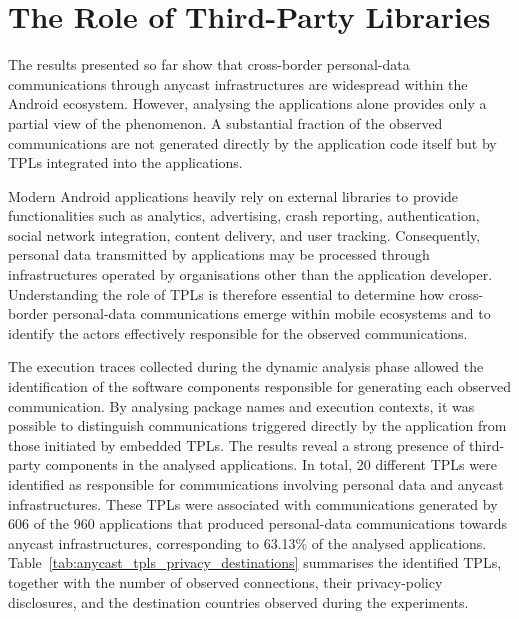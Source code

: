 \section{The Role of Third-Party Libraries}
\label{sc:anycast_experiments_tpls}

The results presented so far show that cross-border personal-data communications through anycast infrastructures are widespread within the Android ecosystem. However, analysing the applications alone provides only a partial view of the phenomenon. A substantial fraction of the observed communications are not generated directly by the application code itself but by TPLs integrated into the applications.

Modern Android applications heavily rely on external libraries to provide functionalities such as analytics, advertising, crash reporting, authentication, social network integration, content delivery, and user tracking. Consequently, personal data transmitted by applications may be processed through infrastructures operated by organisations other than the application developer. Understanding the role of TPLs is therefore essential to determine how cross-border personal-data communications emerge within mobile ecosystems and to identify the actors effectively responsible for the observed communications.

The execution traces collected during the dynamic analysis phase allowed the identification of the software components responsible for generating each observed communication. By analysing package names and execution contexts, it was possible to distinguish communications triggered directly by the application from those initiated by embedded TPLs. The results reveal a strong presence of third-party components in the analysed applications. In total, 20 different TPLs were identified as responsible for communications involving personal data and anycast infrastructures. These TPLs were associated with communications generated by 606 of the 960 applications that produced personal-data communications towards anycast infrastructures, corresponding to 63.13\% of the analysed applications. Table~\ref{tab:anycast_tpls_privacy_destinations} summarises the identified TPLs, together with the number of observed connections, their privacy-policy disclosures, and the destination countries observed during the experiments.

